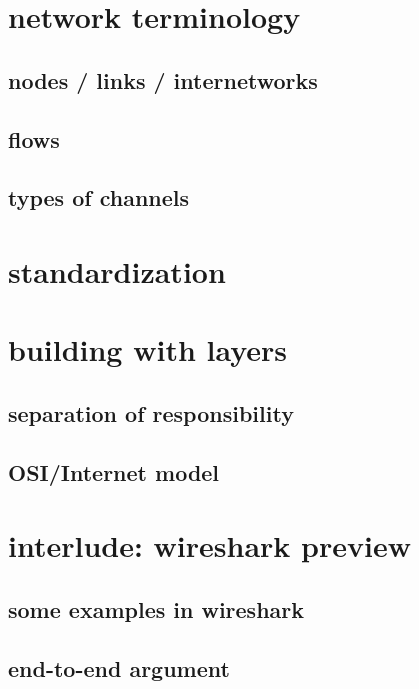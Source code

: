 
\section{network terminology}

\subsection{nodes / links / internetworks}



\subsection{flows}



\subsection{types of channels}



\section{standardization}


\section{building with layers}

\subsection{separation of responsibility}



\subsection{OSI/Internet model}



\section{interlude: wireshark preview}



\subsection{some examples in wireshark}



\subsection{end-to-end argument}



